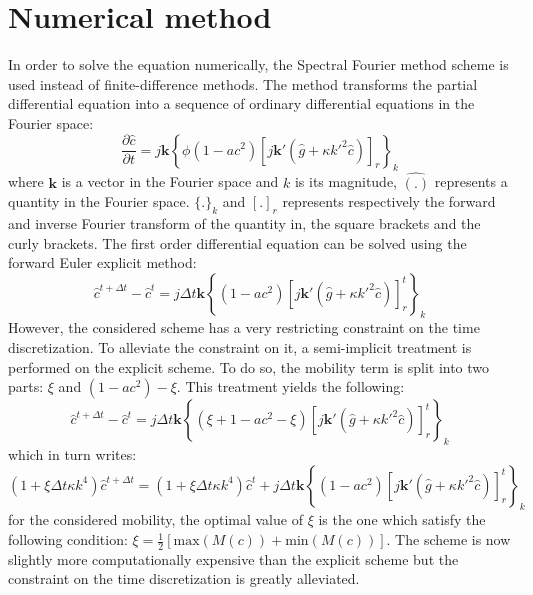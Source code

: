     \section{Numerical method}
    In order to solve the equation numerically, the Spectral Fourier method scheme is used instead of finite-difference methods. The method transforms the partial differential equation into a sequence of ordinary differential equations in the Fourier space:
    \begin{equation}
        \frac{\partial \hat{c}}{\partial t} = j\mathbf{k} \left\{ \phi (1-ac^2) \left[ j\mathbf{k}' (\hat{g} + \kappa {k'}^2 \hat{c}) \right]_r \right\}_k
    \end{equation}
    where $\mathbf{k}$ is a vector in the Fourier space and $k$ is its magnitude, $\hat{(.)}$ represents a quantity in the Fourier space. $\{.\}_k$ and $[.]_r$  represents respectively the forward and inverse Fourier transform of the quantity in, the square brackets and the curly brackets. 
    The first order differential equation can be solved using the forward Euler explicit method:
    \begin{equation}
        \hat{c}^{t+\Delta t}-\hat{c}^{t} = j\Delta t\mathbf{k} \left\{ (1-ac^2) \left[ j\mathbf{k}' (\hat{g} + \kappa {k'}^2 \hat{c}) \right]_r^t \right\}_k
    \end{equation}
    However, the considered scheme has a very restricting constraint on the time discretization. To alleviate the constraint on it, a semi-implicit treatment is performed on the explicit scheme. To do so, the mobility term is split into two parts: $\xi$ and $(1-ac^2) - \xi$. This treatment yields the following:
    \begin{equation}
        \hat{c}^{t+\Delta t}-\hat{c}^{t} = j\Delta t\mathbf{k} \left\{ (\xi + 1-ac^2 -\xi) \left[ j\mathbf{k}' (\hat{g} + \kappa {k'}^2 \hat{c}) \right]_r^t \right\}_k
    \end{equation}
    which in turn writes:
    \begin{equation}
        (1+\xi \Delta t \kappa k^4)\hat{c}^{t+\Delta t} = (1+\xi \Delta t \kappa k^4)\hat{c}^{t} + j\Delta t \mathbf{k} \left\{ (1-ac^2) \left[ j\mathbf{k}' (\hat{g} + \kappa {k'}^2 \hat{c}) \right]_r^t \right\}_k
    \end{equation}
    for the considered mobility, the optimal value of $\xi$ is the one which satisfy the following condition: $\xi=\frac{1}{2}\left[\text{max}(M(c))+\text{min}(M(c))\right]$.
    The scheme is now slightly more computationally expensive than the explicit scheme but the constraint on the time discretization is greatly alleviated.